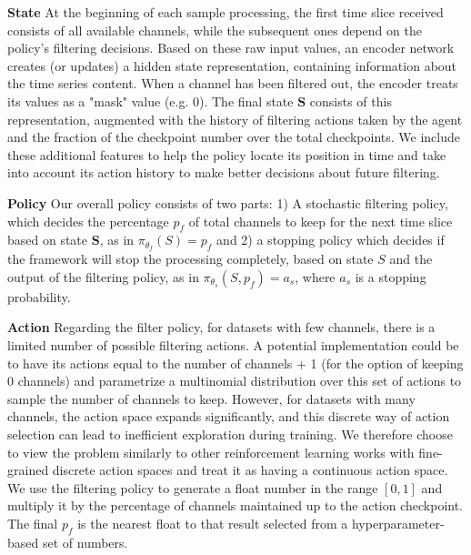\documentclass[conference]{IEEEtran}
\begin{document}
\textbf{State} At the beginning of each sample processing, the first time slice received consists of all available channels, while the subsequent ones depend on the policy's filtering decisions. Based on these raw input values, an encoder network creates (or updates) a hidden state representation, containing information about the time series content. When a channel has been filtered out, the encoder treats its values as a "mask" value (e.g. 0). The final state $\textbf{S}$ consists of this representation, augmented with the history of filtering actions taken by the agent and the fraction of the checkpoint number over the total checkpoints. We include these additional features to help the policy locate its position in time and take into account its action history to make better decisions about future filtering.

\textbf{Policy}
Our overall policy consists of two parts: 1) A stochastic filtering policy, which decides the percentage $p_{f}$ of total channels to keep for the next time slice based on state $\textbf{S}$, as in $\pi_{\theta_{f}}(S) = p_{f}$ and 2) a stopping policy which decides if the framework will stop the processing completely, based on state $S$ and the output of the filtering policy, as in $\pi_{\theta_{s}}(S, p_{f}) = a_{s}$, where $a_{s}$ is a stopping probability.

\textbf{Action} Regarding the filter policy, for datasets with few channels, there is a limited number of possible filtering actions. A potential implementation could be to have its actions equal to the number of channels + 1 (for the option of keeping 0 channels) and parametrize a multinomial distribution over this set of actions to sample the number of channels to keep. However, for datasets with many channels, the action space expands significantly, and this discrete way of action selection can lead to inefficient exploration during training. We therefore choose to view the problem similarly to other reinforcement learning works with fine-grained discrete action spaces\cite{wu2020intermittent} and treat it as having a continuous action space. We use the filtering policy to generate a float number in the range $[0,1]$ and multiply it by the percentage of channels maintained up to the action checkpoint. The final $p_{f}$ is the nearest float to that result selected from a hyperparameter-based set of numbers. 
\end{document}
